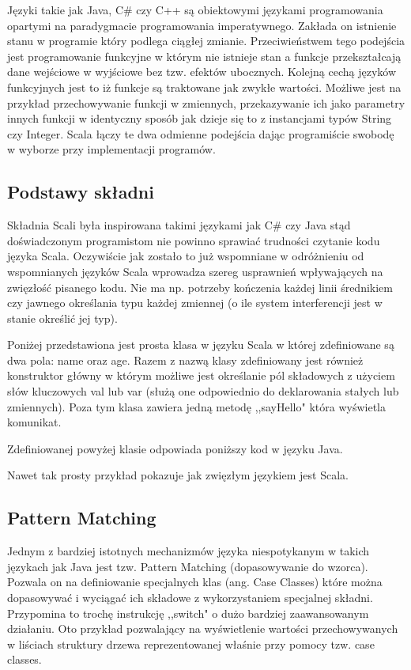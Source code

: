 \documentclass[brudnopis]{xmgr}
\begin{document}
Języki takie jak Java, C\# czy C++ są obiektowymi językami programowania opartymi na paradygmacie programowania imperatywnego. Zakłada on istnienie stanu w programie który podlega ciągłej zmianie. Przeciwieństwem tego podejścia jest programowanie funkcyjne w którym nie istnieje stan a funkcje przekształcają dane wejściowe w wyjściowe bez tzw. efektów ubocznych. Kolejną cechą języków funkcyjnych jest to iż funkcje są traktowane jak zwykłe wartości. Możliwe jest na przykład przechowywanie funkcji w zmiennych, przekazywanie ich jako parametry innych funkcji w identyczny sposób jak dzieje się to z instancjami typów String czy Integer. Scala łączy te dwa odmienne podejścia dając programiście swobodę w wyborze przy implementacji programów.

\subsection{Podstawy składni}
Składnia Scali była inspirowana takimi językami jak C\# czy Java stąd doświadczonym programistom nie powinno sprawiać trudności czytanie kodu języka Scala. Oczywiście jak zostało to już wspomniane w odróżnieniu od wspomnianych języków Scala wprowadza szereg usprawnień wpływających na zwięzłość pisanego kodu. Nie ma np. potrzeby kończenia każdej linii średnikiem czy jawnego określania typu każdej zmiennej (o ile system interferencji jest w stanie określić jej typ).

Poniżej przedstawiona jest prosta klasa w języku Scala w której zdefiniowane są dwa pola: name oraz age. Razem z nazwą klasy zdefiniowany jest również konstruktor główny w którym możliwe jest określanie pól składowych z użyciem słów kluczowych val lub var (służą one odpowiednio do deklarowania stałych lub zmiennych). Poza tym klasa zawiera jedną metodę ,,sayHello" która wyświetla komunikat.



Zdefiniowanej powyżej klasie odpowiada poniższy kod w języku Java.



Nawet tak prosty przykład pokazuje jak zwięzłym językiem jest Scala.

\subsection{Pattern Matching}

Jednym z bardziej istotnych mechanizmów języka niespotykanym w takich językach jak Java jest tzw. Pattern Matching (dopasowywanie do wzorca). Pozwala on na definiowanie specjalnych klas (ang. Case Classes) które można dopasowywać i wyciągać ich składowe z wykorzystaniem specjalnej składni. Przypomina to trochę instrukcję ,,switch" o dużo bardziej zaawansowanym działaniu. Oto przykład pozwalający na wyświetlenie wartości przechowywanych w liściach struktury drzewa reprezentowanej właśnie przy pomocy tzw. case classes.
\end{document}
